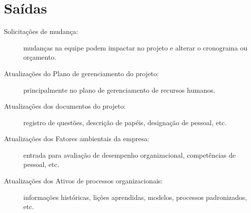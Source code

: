 \section{Saídas}

\begin{description}

	\item[Solicitações de mudança:] mudanças na equipe podem impactar no projeto e alterar o cronograma ou orçamento.
	
	\item[Atualizações do Plano de gerenciamento do projeto:] principalmente no plano de gerenciamento de recursos humanos.
	
	\item[Atualizações dos documentos do projeto:] registro de questões, descrição de papéis, designação de pessoal, etc.
	
	\item[Atualizações dos Fatores ambientais da empresa:] entrada para avaliação de desempenho organizacional, competências de pessoal, etc.
	
	\item[Atualizações dos Ativos de processos organizacionais:] informações históricas, lições aprendidas, modelos, processos padronizados, etc.
	
	
\end{description}